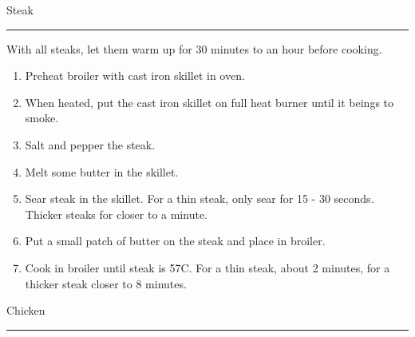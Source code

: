 \documentclass[11pt,oneside]{article}
\begin{document}
 \selectfont

\begin{center}\selectfont\Huge{}Steak\end{center}
\vspace{-8pt} \rule{\textwidth}{1pt}
\vspace{-1pt}

With all steaks, let them warm up for 30 minutes to an hour before cooking.

\begin{enumerate}
\item Preheat broiler with cast iron skillet in oven.
\item When heated, put the cast iron skillet on full heat burner until it beings to smoke.
\item Salt and pepper the steak.
\item Melt some butter in the skillet.
\item Sear steak in the skillet.  For a thin steak, only sear for 15 - 30 seconds.  Thicker steaks for closer to a minute.
\item Put a small patch of butter on the steak and place in broiler.
\item Cook in broiler until steak is 57\degree C.  For a thin steak, about 2 minutes, for a thicker steak closer to 8 minutes.
\end{enumerate}

\begin{center}\selectfont\Huge{}Chicken\end{center}
\vspace{-8pt} \rule{\textwidth}{1pt}
\vspace{-1pt}
\end{document}
